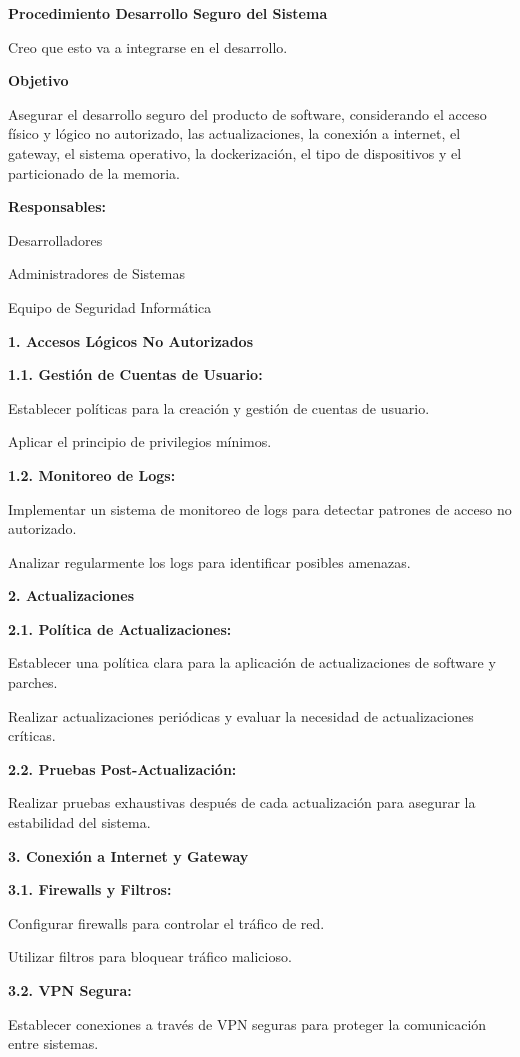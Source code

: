 \label{Anexo}
\textbf{Procedimiento Desarrollo Seguro del Sistema}

Creo que esto va a integrarse en el desarrollo.

\textbf{Objetivo}

Asegurar el desarrollo seguro del producto de software, considerando el acceso físico y lógico no autorizado, las actualizaciones, la conexión a internet, el gateway, el sistema operativo, la dockerización, el tipo de dispositivos y el particionado de la memoria.

\textbf{Responsables:}

Desarrolladores

Administradores de Sistemas

Equipo de Seguridad Informática

\textbf{1. Accesos Lógicos No Autorizados}

\textbf{1.1. Gestión de Cuentas de Usuario:}

Establecer políticas para la creación y gestión de cuentas de usuario.

Aplicar el principio de privilegios mínimos.

\textbf{1.2. Monitoreo de Logs:}

Implementar un sistema de monitoreo de logs para detectar patrones de acceso no autorizado.

Analizar regularmente los logs para identificar posibles amenazas.

\textbf{2. Actualizaciones}

\textbf{2.1. Política de Actualizaciones:}

Establecer una política clara para la aplicación de actualizaciones de software y parches. 

Realizar actualizaciones periódicas y evaluar la necesidad de actualizaciones críticas.

\textbf{2.2. Pruebas Post-Actualización:}

Realizar pruebas exhaustivas después de cada actualización para asegurar la estabilidad del sistema.

\textbf{3. Conexión a Internet y Gateway}

\textbf{3.1. Firewalls y Filtros:}

Configurar firewalls para controlar el tráfico de red.

Utilizar filtros para bloquear tráfico malicioso.

\textbf{3.2. VPN Segura:}

Establecer conexiones a través de VPN seguras para proteger la comunicación entre sistemas.

